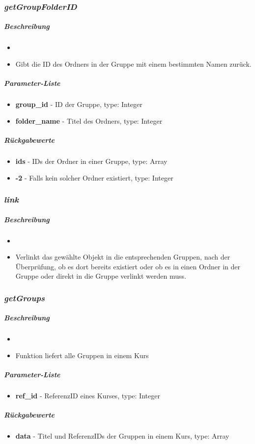 \subsubsection*{\textit{getGroupFolderID}}\label{getGroupFolderIDLGUI}
\subparagraph{Beschreibung}
\begin{itemize}
	\item[] \noindent{} 
	\item[] Gibt die ID des Ordners in der Gruppe mit einem bestimmten Namen zurück.
\end{itemize}
\subparagraph{Parameter-Liste}
\begin{itemize}
	\item[] \textbf{group\_id} - ID der Gruppe, type: Integer
	\item[] \textbf{folder\_name} - Titel des Ordners, type: Integer
\end{itemize}
\subparagraph{Rückgabewerte}
\begin{itemize}
	\item[] \textbf{ids} - IDs der Ordner in einer Gruppe, type: Array
	\item[] \textbf{-2} - Falls kein solcher Ordner existiert, type: Integer
\end{itemize}

\subsubsection*{\textit{link}}\label{linkLGUI}
\subparagraph{Beschreibung}
\begin{itemize}
	\item[] \noindent{} 
	\item[] Verlinkt das gewählte Objekt in die entsprechenden Gruppen, nach der Überprüfung, ob es dort bereits existiert oder ob es in einen Ordner in der Gruppe oder direkt in die Gruppe verlinkt werden muss.
\end{itemize}

\subsubsection*{\textit{getGroups}}\label{getGroupsLGUI}
\subparagraph{Beschreibung}
\begin{itemize}
	\item[] \noindent{} 
	\item[] Funktion liefert alle Gruppen in einem Kurs
\end{itemize}
\subparagraph{Parameter-Liste}
\begin{itemize}
	\item[] \textbf{ref\_id} - ReferenzID eines Kurses, type: Integer
\end{itemize}
\subparagraph{Rückgabewerte}
\begin{itemize}
	\item[] \textbf{data} - Titel und ReferenzIDs der Gruppen in einem Kurs, type: Array
\end{itemize}

